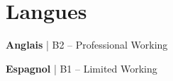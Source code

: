 \section{\icon{\faLanguage} Langues}

\begin{minipage}[t]{0.45\textwidth}
  \textbf{Anglais} \textcolor{muted}{| B2 -- Professional Working}
\end{minipage}
\hfill
\begin{minipage}[t]{0.45\textwidth}
  \textbf{Espagnol} \textcolor{muted}{| B1 -- Limited Working}
\end{minipage}

